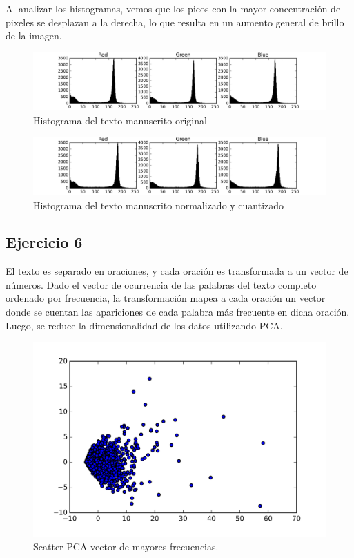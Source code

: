 \documentclass[11pt,spanish]{article}
\begin{document}
Al analizar los histogramas, vemos que los picos con la mayor concentración de pixeles se desplazan a la derecha, lo que resulta en un aumento general de brillo de la imagen.

\begin{figure}[htbp]
	\centering
	\includegraphics[width=1\textwidth]{../words_image_histogram.jpg}
	\caption{Histograma del texto manuscrito original}
	\label{hist_original_word}
\end{figure}

\begin{figure}[htbp]
	\centering
	\includegraphics[width=1\textwidth]{../words_quantized_image_histogram.jpg}
	\caption{Histograma del texto manuscrito normalizado y cuantizado}
	\label{hist_quantized_word}
\end{figure}

\subsection*{Ejercicio 6}
El texto es separado en oraciones, y cada oración es transformada a un vector de números. Dado el vector de ocurrencia de las palabras del texto completo ordenado por frecuencia, la transformación mapea a cada oración un vector donde se cuentan las apariciones de cada palabra más frecuente en dicha oración. Luego, se reduce la dimensionalidad de los datos utilizando PCA.

\begin{figure}[htbp]
	\centering
	\includegraphics[width=.8\textwidth]{../pca_top_freq}
	\caption{Scatter PCA vector de mayores frecuencias.}
	\label{pca_top}
\end{figure}
\end{document}
